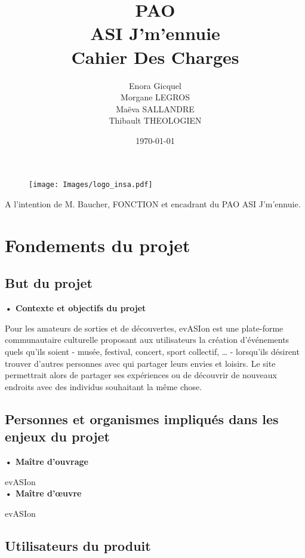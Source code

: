 \documentclass[a4paper,12pt]{article}
\title{PAO\\ASI J'm'ennuie\\Cahier Des Charges}
\author{Enora Gicquel\\Morgane LEGROS\\Maëva SALLANDRE\\Thibault THEOLOGIEN}
\date{\today}
\begin{document}
\begin{titlepage}
\vfill
	\begin{figure}
	\texttt{[image: Images/logo\_insa.pdf]}
	\end{figure}

\maketitle

A l'intention de M. Baucher, FONCTION et encadrant du PAO ASI J'm'ennuie.
\vfill
\noindent \hrulefill

\end{titlepage}



\newpage
\tableofcontents
\newpage

\section{Fondements du projet}

\subsection{But du projet}

\textbf{• Contexte et objectifs du projet}

Pour les amateurs de sorties et de découvertes, evASIon est une plate-forme communautaire culturelle proposant aux utilisateurs la création d’événements quels qu’ils soient - musée, festival, concert, sport collectif, … - lorsqu’ils désirent trouver d’autres personnes avec qui partager leurs envies et loisirs. Le site permettrait alors de partager ses expériences ou de découvrir de nouveaux endroits avec des individus souhaitant la même chose.

\subsection{Personnes et organismes impliqués dans les enjeux du projet}

\textbf{• Maître d’ouvrage}

evASIon \\

\textbf{• Maître d’œuvre}

evASIon

\subsection{Utilisateurs du produit}
\end{document}
